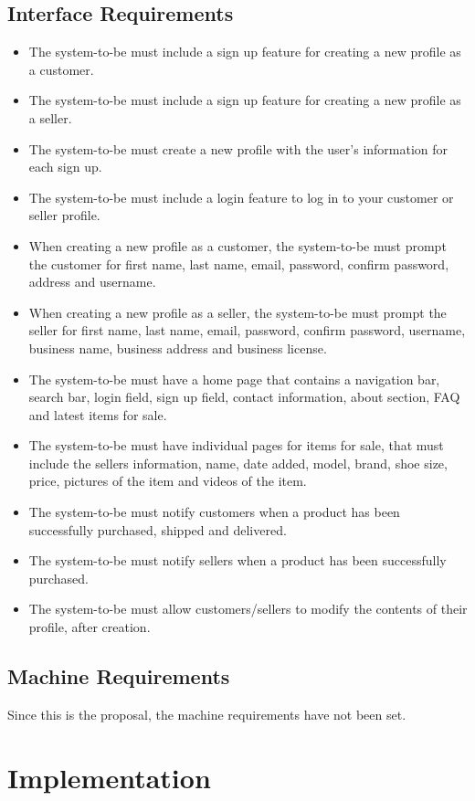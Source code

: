 \subsection{Interface Requirements}
\begin{itemize}
    \item The system-to-be must include a sign up feature for creating a new profile as a customer.
    \item The system-to-be must include a sign up feature for creating a new profile as a seller.
    \item The system-to-be must create a new profile with the user's information for each sign up.
    \item The system-to-be must include a login feature to log in to your customer or seller profile.
    \item When creating a new profile as a customer, the system-to-be must prompt the customer for first name, last name, email, password, confirm password, address and username.
    \item When creating a new profile as a seller, the system-to-be must prompt the seller for first name, last name, email, password, confirm password, username, business name, business address and business license.
    \item The system-to-be must have a home page that contains a navigation bar, search bar, login field, sign up field, contact information, about section, FAQ and latest items for sale.
    \item The system-to-be must have individual pages for items for sale, that must include the sellers information, name, date added, model, brand, shoe size, price, pictures of the item and videos of the item.
    \item The system-to-be must notify customers when a product has been successfully purchased, shipped and delivered.
    \item The system-to-be must notify sellers when a product has been successfully purchased.
    \item The system-to-be must allow customers/sellers to modify the contents of their profile, after creation.
\end{itemize}
\subsection{Machine Requirements}
Since this is the proposal, the machine requirements have not been set.
\section{Implementation}
